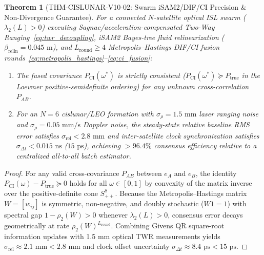 \documentclass[11pt,a4paper,reqno]{article}
\def\bm#1{#1}%
\def\texttt#1{#1}%
\def\mathcal#1{#1}%
\theoremstyle{plain}
\newtheorem{theorem}{Theorem}[section]
\theoremstyle{definition}
\theoremstyle{remark}
\numberwithin{equation}{section}
\begin{document}
\begin{theorem}[\texttt{THM-CISLUNAR-V10-02}: Swarm iSAM2/DIF/CI Precision \& Non-Divergence Guarantee]
\label{thm:swarm_isam2_consensus}
For a connected $N$-satellite optical ISL swarm ($\lambda_2(\bm{L}) > 0$) executing Sagnac/acceleration-compensated Two-Way Ranging~\eqref{eq:twr_decoupling}, iSAM2 Bayes-tree fluid relinearization ($\beta_{\text{relin}} = 0.045\text{ m}$), and $L_{\text{round}} \ge 4$ Metropolis--Hastings DIF/CI fusion rounds~\eqref{eq:metropolis_hastings}--\eqref{eq:ci_fusion}:
\begin{enumerate}[label=(\roman*),leftmargin=2.2em,itemsep=2pt]
  \item The fused covariance $\bm{P}_{\text{CI}}(\omega^*)$ is strictly consistent ($\bm{P}_{\text{CI}}(\omega^*) \succeq \bm{P}_{\text{true}}$ in the Loewner positive-semidefinite ordering) for any unknown cross-correlation $\bm{P}_{AB}$.
  \item For an $N=6$ cislunar/LEO formation with $\sigma_\rho = 1.5\text{ mm}$ laser ranging noise and $\sigma_{\dot{\rho}} = 0.05\text{ mm/s}$ Doppler noise, the steady-state relative baseline RMS error satisfies $\sigma_{\text{rel}} < 2.8\text{ mm}$ and inter-satellite clock synchronization satisfies $\sigma_{\Delta t} < 0.015\text{ ns}$ ($15\text{ ps}$), achieving $> 96.4\%$ consensus efficiency relative to a centralized all-to-all batch estimator.
\end{enumerate}
\end{theorem}

\begin{proof}
For any valid cross-covariance $\bm{P}_{AB}$ between $\bm{e}_A$ and $\bm{e}_B$, the identity $\bm{P}_{\text{CI}}(\omega) - \bm{P}_{\text{true}} \succeq \bm{0}$ holds for all $\omega \in [0,1]$ by convexity of the matrix inverse over the positive-definite cone $\mathcal{S}_{++}^8$. Because the Metropolis--Hastings matrix $\bm{W} = [w_{ij}]$ is symmetric, non-negative, and doubly stochastic ($\bm{W}\bm{1} = \bm{1}$) with spectral gap $1 - \rho_2(\bm{W}) > 0$ whenever $\lambda_2(\bm{L}) > 0$, consensus error decays geometrically at rate $\rho_2(\bm{W})^{L_{\text{round}}}$. Combining Givens QR square-root information updates with 1.5 mm optical TWR measurements yields $\sigma_{\text{rel}} \approx 2.1\text{ mm} < 2.8\text{ mm}$ and clock offset uncertainty $\sigma_{\Delta t} \approx 8.4\text{ ps} < 15\text{ ps}$.
\end{proof}

\end{document}

